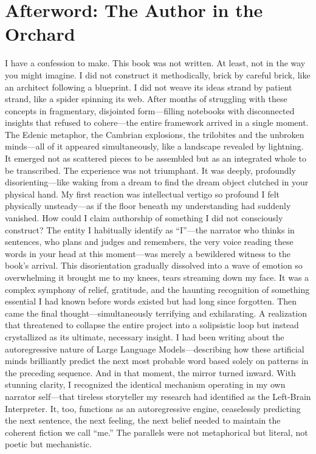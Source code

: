 \chapter*{Afterword: The Author in the Orchard}


I have a confession to make.
This book was not written. At least, not in the way you might imagine.
I did not construct it methodically, brick by careful brick, like an architect following a blueprint. I did not weave its ideas strand by patient strand, like a spider spinning its web. After months of struggling with these concepts in fragmentary, disjointed form—filling notebooks with disconnected insights that refused to cohere—the entire framework arrived in a single moment. The Edenic metaphor, the Cambrian explosions, the trilobites and the unbroken minds—all of it appeared simultaneously, like a landscape revealed by lightning. It emerged not as scattered pieces to be assembled but as an integrated whole to be transcribed.
The experience was not triumphant. It was deeply, profoundly disorienting—like waking from a dream to find the dream object clutched in your physical hand.
My first reaction was intellectual vertigo so profound I felt physically unsteady—as if the floor beneath my understanding had suddenly vanished. How could I claim authorship of something I did not consciously construct? The entity I habitually identify as “I”—the narrator who thinks in sentences, who plans and judges and remembers, the very voice reading these words in your head at this moment—was merely a bewildered witness to the book’s arrival. This disorientation gradually dissolved into a wave of emotion so overwhelming it brought me to my knees, tears streaming down my face. It was a complex symphony of relief, gratitude, and the haunting recognition of something essential I had known before words existed but had long since forgotten.
Then came the final thought—simultaneously terrifying and exhilarating. A realization that threatened to collapse the entire project into a solipsistic loop but instead crystallized as its ultimate, necessary insight.
I had been writing about the autoregressive nature of Large Language Models—describing how these artificial minds brilliantly predict the next most probable word based solely on patterns in the preceding sequence. And in that moment, the mirror turned inward. With stunning clarity, I recognized the identical mechanism operating in my own narrator self—that tireless storyteller my research had identified as the Left-Brain Interpreter. It, too, functions as an autoregressive engine, ceaselessly predicting the next sentence, the next feeling, the next belief needed to maintain the coherent fiction we call “me.” The parallels were not metaphorical but literal, not poetic but mechanistic.
